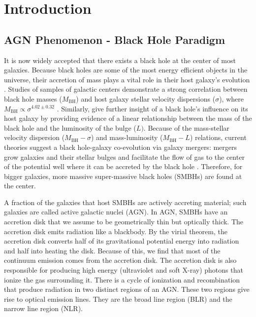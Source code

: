 \chapter{Introduction}
\label{chap1}


\section{AGN Phenomenon - Black Hole Paradigm}
\label{sub1_1}

It is now widely accepted that there exists a black hole at the center of most galaxies.
Because black holes are some of the most energy efficient objects in the universe, their accretion of mass plays a vital role in their host galaxy's evolution  \citep{Schawinski2012}.
Studies of samples of galactic centers demonstrate a strong correlation between black hole masses ($M_{\text{BH}}$) and host galaxy stellar velocity dispersions ($\sigma$), where $M_{\text{BH}} \propto \sigma^{4.02\pm 0.32}$ \citep{Tremaine2002}.
Similarly, \cite{KormendyAndHo2013} give further insight of a black hole's influence on its host galaxy by providing evidence of a linear relationship between the mass of the black hole and the luminosity of the bulge ($L)$.
Because of the mass-stellar velocity dispersion ($M_{\text{BH}}-\sigma$) and mass-luminosity ($M_{\text{BH}}-L$) relations, current theories suggest a black hole-galaxy co-evolution via galaxy mergers: mergers grow galaxies and their stellar bulges and facilitate the flow of gas to the center of the potential well where it can be accreted by the black hole \citep{haring2004} .
Therefore, for bigger galaxies, more massive super-massive black holes (SMBHs) are found at the center. 


A fraction of the galaxies that host SMBHs are actively accreting material; such galaxies are called active galactic nuclei (AGN).
In AGN, SMBHs have an accretion disk that we assume to be geometrically thin but optically thick.
The accretion disk emits radiation like a blackbody.
By the virial theorem, the accretion disk converts half of its gravitational potential energy into radiation and half into heating the disk.
Because of this, we find that most of the continuum emission comes from the accretion disk. 
The accretion disk is also responsible for producing high energy (ultraviolet and soft X-ray) photons that ionize the gas surrounding it.
There is a cycle of ionization and recombination that produce radiation in two distinct regions of an AGN.
These two regions give rise to optical emission lines. 
They are the broad line region (BLR) and the narrow line region (NLR).

